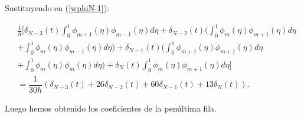 \begin{itemize}
Sustituyendo en (\ref{wphiN-1}):

\begin{align*}
    &\frac{1}{h}\Bigg[\delta_{N-3}(t)\int_{0}^{1}\phi_{m+1}(\eta)\phi_{m-1}(\eta)d\eta + \delta_{N-2}(t)\Bigg(\int_{0}^{1}\phi_{m}(\eta)\phi_{m+1}(\eta)d\eta\\
    & +\int_{0}^{1}\phi_{m}(\eta)\phi_{m-1}(\eta)d\eta\Bigg)+\delta_{N-1}(t)\Bigg(\int_{0}^{1}\phi_{m+1}(\eta)\phi_{m+1}(\eta)d\eta\\
    &+\int_{0}^{1}\phi_{m}(\eta)\phi_{m}(\eta)d\eta\Bigg) +\delta_{N}(t)\int_{0}^{1}\phi_{m}(\eta)\phi_{m+1}(\eta)d\eta\Bigg]\\
    & =\dfrac{1}{30h}(\delta_{N-3}(t)+26\delta_{N-2}(t)+60\delta_{N-1}(t)+13\delta_{N}(t)).
\end{align*}

Luego hemos obtenido los coeficientes de la penúltima fila.

\end{itemize}


